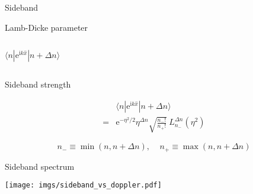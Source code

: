\documentclass{beamer}
\newcommand{\ue}{\mathrm{e}}
\newcommand{\ui}{\mathrm{i}}
\newcommand{\eqar}[1]
{
  \begin{align*}
    #1
  \end{align*}
}
\newcommand{\paren}[1]{{\left({#1}\right)}}
\begin{document}
\begin{frame}{Sideband}
\begin{center}
  \end{center}
\end{frame}

\begin{frame}{Lamb-Dicke parameter}
  \begin{center}
    \begin{columns}
      \column{5.8cm}
      \[\langle n|\ue^{\ui k\hat x}|n+\Delta n\rangle\]
      \visible<2->{
        \[\hat x=\sqrt{\frac{\hbar}{2m\omega}}\paren{a+a^\dagger}=z_0\paren{a+a^\dagger}\]
      }
      \visible<3->{
        \[k\hat x=\eta\paren{a+a^\dagger}\]
        \[\eta\equiv kz_0=k\sqrt{\frac{\hbar}{2m\omega}}\]
      }
      \column{5.8cm}
    \end{columns}
  \end{center}
\end{frame}

\begin{frame}{Sideband strength}
  \begin{center}
    \vspace{-1cm}
    \eqar{
      &\langle n|\ue^{\ui k\hat x}|n+\Delta n\rangle\\
      =&\ue^{-\eta^2/2}\eta^{\Delta n}\sqrt{\frac{n_{-}!}{n_{+}!}}\ L^{\Delta n}_{n_{-}}(\eta^2)
    }
    \[n_{-}\equiv\min(n, n+\Delta n),\ \ \ \ \ n_{+}\equiv\max(n, n+\Delta n)\]
  \end{center}
\end{frame}

\begin{frame}{Sideband spectrum}
  \begin{center}
    \texttt{[image: imgs/sideband\_vs\_doppler.pdf]}
  \end{center}
\end{frame}
\end{document}
